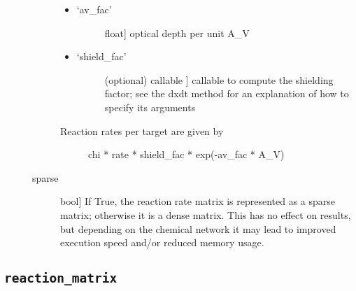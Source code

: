 \documentclass[letterpaper,10pt,english]{sphinxmanual}
\begin{document}
\begin{fulllineitems}
\begin{description}
\begin{description}
\begin{itemize}
\begin{description}
\end{description}

\item {} \begin{description}
\item[{`av\_fac'}] \leavevmode{[}float{]}
optical depth per unit A\_V

\end{description}

\item {} \begin{description}
\item[{`shield\_fac'}] \leavevmode{[}(optional) callable {]}
callable to compute the
shielding factor; see the dxdt method for an
explanation of how to specify its arguments

\end{description}

\end{itemize}
\begin{description}
\item[{Reaction rates per target are given by }] \leavevmode
chi * rate * shield\_fac * exp(-av\_fac * A\_V)

\end{description}

\item[{sparse}] \leavevmode{[}bool{]}
If True, the reaction rate matrix is represented as a
sparse matrix; otherwise it is a dense matrix. This has no
effect on results, but depending on the chemical network it
may lead to improved execution speed and/or reduced memory
usage.

\end{description}

\end{description}

\end{fulllineitems}



\subsection{\texttt{reaction\_matrix}}
\label{fulldoc:reaction-matrix}
\end{document}
